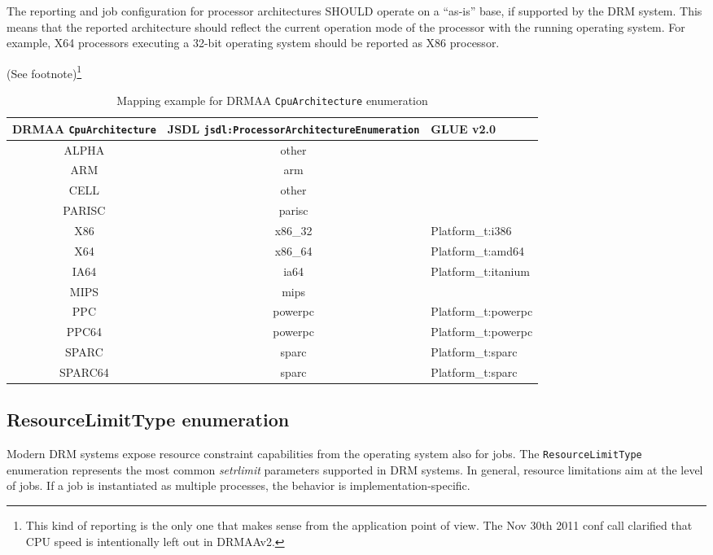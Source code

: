 \documentclass{article}
\newcommand{\h}[1]{\lstinline|#1|}
\newcommand{\rat}[1]{ {\tiny(See footnote)}\footnote{#1} }
\begin{document}
The reporting and job configuration for processor architectures SHOULD operate on a \enquote{as-is} base, if supported by the DRM system. This means that the reported architecture should reflect the current operation mode of the processor with the running operating system. For example, X64 processors executing a 32-bit operating system should be reported as X86 processor.   

\rat{This kind of reporting is the only one that makes sense from the application point of view. The Nov 30th 2011 conf call clarified that CPU speed is intentionally left out in DRMAAv2.}

\begin{table}[ht]
\centering
\begin{tabularx}{\textwidth}{|c|c|X|}
\hline
DRMAA \h{CpuArchitecture} & JSDL \h{jsdl:ProcessorArchitectureEnumeration} & GLUE v2.0 \\
\hline
ALPHA	&	other & \\
ARM		&	arm & \\
CELL	&	other & \\
PARISC	&	parisc & \\
X86		&	x86\_32 & Platform\_t:i386 \\
X64		&	x86\_64 & Platform\_t:amd64 \\
IA64	&	ia64 & Platform\_t:itanium \\
MIPS	&	mips & \\
PPC		&	powerpc & Platform\_t:powerpc \\
PPC64	&	powerpc & Platform\_t:powerpc \\
SPARC	&	sparc & Platform\_t:sparc \\
SPARC64	&	sparc & Platform\_t:sparc \\
\hline
\end{tabularx}
\caption{Mapping example for DRMAA \h{CpuArchitecture} enumeration}
\label{tab:cpumappings}
\end{table}

\subsection{ResourceLimitType enumeration}
\label{sec:resourcelimittype}

Modern DRM systems expose resource constraint capabilities from the operating system also for jobs. The \h{ResourceLimitType} enumeration represents the most common \emph{setrlimit} parameters \cite{posixutils} supported in DRM systems. In general, resource limitations aim at the level of jobs. If a job is instantiated as multiple processes, the behavior is implementation-specific.
\end{document}
